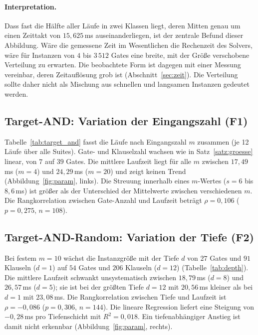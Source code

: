 \documentclass[a4paper,12pt]{article}
\theoremstyle{definition}
\newcommand{\resultsdir}{../src/results}
\begin{document}
\paragraph{Interpretation.} Dass fast die Hälfte aller Läufe in zwei Klassen liegt, deren Mitten genau um einen Zeittakt von $15{,}625$\,ms auseinanderliegen, ist der zentrale Befund dieser Abbildung. Wäre die gemessene Zeit im Wesentlichen die Rechenzeit des Solvers, wäre für Instanzen von $4$ bis $3\,512$ Gates eine breite, mit der Größe verschobene Verteilung zu erwarten. Die beobachtete Form ist dagegen mit einer Messung vereinbar, deren Zeitauflösung grob ist (Abschnitt~\ref{sec:zeit}). Die Verteilung sollte daher nicht als Mischung aus \glqq schnellen\grqq{} und \glqq langsamen\grqq{} Instanzen gedeutet werden.

\subsection{Target-AND: Variation der Eingangszahl (F1)}

Tabelle~\ref{tab:target_and} fasst die Läufe nach Eingangszahl $m$ zusammen (je 12 Läufe über alle Suites). Gate- und Klauselzahl wachsen wie in Satz~\ref{satz:groesse} linear, von $7$ auf $39$ Gates. Die mittlere Laufzeit liegt für alle $m$ zwischen $17{,}49$\,ms ($m=4$) und $24{,}29$\,ms ($m=20$) und zeigt keinen Trend (Abbildung~\ref{fig:param}, links). Die Streuung innerhalb eines $m$-Wertes ($s = 6$ bis $8{,}6$\,ms) ist größer als der Unterschied der Mittelwerte zwischen verschiedenen $m$. Die Rangkorrelation zwischen Gate-Anzahl und Laufzeit beträgt $\rho = 0{,}106$ ($p = 0{,}275$, $n = 108$).

\begin{table}[ht]
\centering\small

\caption{Target-AND-Circuits: Struktur und Laufzeit (ms) je Eingangszahl $m$, über alle vier Suites aggregiert.}
\label{tab:target_and}
\end{table}

\subsection{Target-AND-Random: Variation der Tiefe (F2)}

Bei festem $m = 10$ wächst die Instanzgröße mit der Tiefe $d$ von $27$ Gates und $91$ Klauseln ($d=1$) auf $54$ Gates und $206$ Klauseln ($d=12$) (Tabelle~\ref{tab:depth}). Die mittlere Laufzeit schwankt unsystematisch zwischen $18{,}79$\,ms ($d=8$) und $26{,}57$\,ms ($d=5$); sie ist bei der größten Tiefe $d=12$ mit $20{,}56$\,ms kleiner als bei $d=1$ mit $23{,}08$\,ms. Die Rangkorrelation zwischen Tiefe und Laufzeit ist $\rho = -0{,}086$ ($p = 0{,}306$, $n = 144$). Die lineare Regression liefert eine Steigung von $-0{,}28$\,ms pro Tiefenschicht mit $R^2 = 0{,}018$. Ein tiefenabhängiger Anstieg ist damit nicht erkennbar (Abbildung~\ref{fig:param}, rechts).
\end{document}
